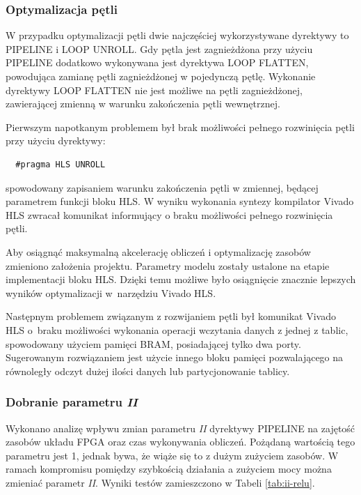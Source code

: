 \subsubsection{Optymalizacja pętli}

W przypadku optymalizacji pętli dwie najczęściej wykorzystywane dyrektywy to PIPELINE i LOOP UNROLL. Gdy pętla jest zagnieżdżona przy użyciu PIPELINE dodatkowo wykonywana jest dyrektywa LOOP FLATTEN, powodująca zamianę pętli zagnieżdżonej w pojedynczą pętlę. Wykonanie dyrektywy LOOP FLATTEN nie jest możliwe na pętli zagnieżdżonej, zawierającej zmienną w warunku zakończenia pętli wewnętrznej.

Pierwszym napotkanym problemem był brak możliwości pełnego rozwinięcia pętli przy użyciu dyrektywy:
\begin{verbatim}
  #pragma HLS UNROLL
\end{verbatim}
spowodowany zapisaniem warunku zakończenia pętli w zmiennej, będącej parametrem funkcji bloku HLS. 
W wyniku wykonania syntezy kompilator Vivado HLS zwracał komunikat informujący o braku możliwości pełnego rozwinięcia pętli.

Aby osiągnąć maksymalną akcelerację obliczeń i optymalizację zasobów zmieniono założenia projektu. Parametry modelu zostały ustalone na etapie implementacji bloku HLS. Dzięki temu możliwe było osiągnięcie znacznie lepszych wyników optymalizacji w~narzędziu Vivado HLS.

Następnym problemem związanym z rozwijaniem pętli był komunikat Vivado HLS o~braku możliwości wykonania operacji wczytania danych z jednej z tablic, spowodowany użyciem pamięci BRAM, posiadającej tylko dwa porty. Sugerowanym rozwiązaniem jest użycie innego bloku pamięci pozwalającego na równoległy odczyt dużej ilości danych lub partycjonowanie tablicy.

\subsubsection{Dobranie parametru \emph{II}}

Wykonano analizę wpływu zmian parametru \emph{II} dyrektywy PIPELINE na zajętość zasobów układu FPGA oraz czas wykonywania obliczeń. Pożądaną wartością tego parametru jest 1, jednak bywa, że wiąże się to z dużym zużyciem zasobów. W ramach kompromisu pomiędzy szybkością działania a zużyciem mocy można zmieniać parametr \emph{II}. Wyniki testów zamieszczono w Tabeli \ref{tab:ii-relu}.

